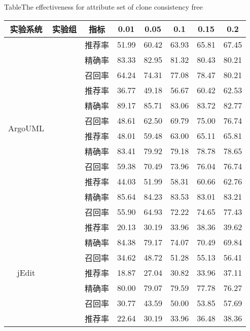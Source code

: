 \begin{table} 
\renewcommand\arraystretch{0.65} 
{Table$\!$}{The effectiveness for attribute set of clone consistency free}
\vspace{0.5em}
\centering
\wuhao
\begin{tabular}{cccccccc}
\toprule[1.5pt]
{实验系统}&{实验组}&{指标}&{0.01}&{0.05}&{0.1}&{0.15}&{0.2}\\
\midrule[1pt]
\multirow{12}{*}{ArgoUML}
&~\multirow{3}{*}{全部属性(\%) }
& 推荐率 & 51.99 & 60.42 & 63.93 & 65.81 & 67.45 \\
&& 精确率 & 83.33 & 82.95 & 81.32 & 80.43 & 80.21 \\
& & 召回率 & 64.24 & 74.31 & 77.08 & 78.47 & 80.21 \\
\cline{2-8}
&~\multirow{3}{*}{无代码属性(\%)}    
& 推荐率 & 36.77 & 49.18 & 56.67 & 60.42 & 62.53 \\
& & 精确率 & 89.17 & 85.71 & 83.06 & 83.72 & 82.77 \\
& &召回率 & 48.61 & 62.50 & 69.79 & 75.00 & 76.74 \\
\cline{2-8}
&~\multirow{3}{*}{无上下文属性(\%)}    
& 推荐率 & 48.01 & 59.48 & 63.00 & 65.11 & 65.81 \\
&& 精确率 & 83.41 & 79.92 & 79.18 & 78.78 & 78.65 \\
&& 召回率 & 59.38 & 70.49 & 73.96 & 76.04 & 76.74 \\
\cline{2-8}
&~\multirow{3}{*}{无演化属性(\%)}    
& 推荐率 & 44.03 & 51.99 & 58.31 & 60.66 & 62.76 \\
&  & 精确率 & 85.64 & 84.23 & 83.53 & 83.01 & 83.21 \\
& & 召回率 & 55.90 & 64.93 & 72.22 & 74.65 & 77.43 \\
\hline
\multirow{12}{*}{jEdit}
&~\multirow{3}{*}{全部属性(\%) }
& 推荐率 & 20.13 & 30.19 & 33.96 & 38.36 & 39.62 \\
&  &精确率 & 84.38 & 79.17 & 74.07 & 70.49 & 69.84 \\
& & 召回率 & 34.62 & 48.72 & 51.28 & 55.13 & 56.41 \\
\cline{2-8}
&~\multirow{3}{*}{无代码属性(\%)}    
& 推荐率 & 18.87 & 27.04 & 30.82 & 33.96 & 37.11 \\
&  &精确率 & 80.00 & 79.07 & 79.59 & 77.78 & 76.27 \\
&  &召回率 & 30.77 & 43.59 & 50.00 & 53.85 & 57.69 \\
\cline{2-8}
&~\multirow{3}{*}{无上下文属性(\%)}    
& 推荐率 & 22.64 & 30.19 & 33.96 & 36.48 & 38.36 \\

\end{tabular}
\end{table}
